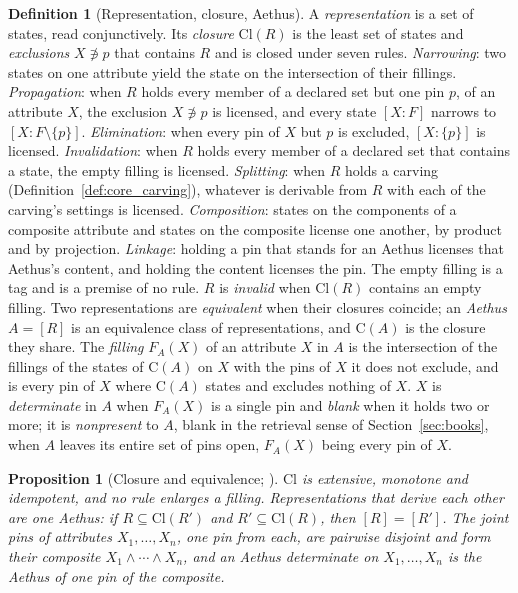 \documentclass[11pt]{article}
\newtheorem{proposition}{Proposition}
\theoremstyle{definition}
\newtheorem{definition}{Definition}
\newcommand{\Aethus}{Aethus}
\begin{document}
\begin{definition}[Representation, closure, \Aethus{}]\label{def:core_aethus}
A \emph{representation} is a set of states, read conjunctively. Its \emph{closure} $\mathrm{Cl}(R)$ is the least set of states and \emph{exclusions} $X \not\ni p$ that contains $R$ and is closed under seven rules. \emph{Narrowing}: two states on one attribute yield the state on the intersection of their fillings. \emph{Propagation}: when $R$ holds every member of a declared set but one pin $p$, of an attribute $X$, the exclusion $X \not\ni p$ is licensed, and every state $[X : F]$ narrows to $[X : F \setminus \{p\}]$. \emph{Elimination}: when every pin of $X$ but $p$ is excluded, $[X : \{p\}]$ is licensed. \emph{Invalidation}: when $R$ holds every member of a declared set that contains a state, the empty filling is licensed. \emph{Splitting}: when $R$ holds a carving (Definition~\ref{def:core_carving}), whatever is derivable from $R$ with each of the carving's settings is licensed. \emph{Composition}: states on the components of a composite attribute and states on the composite license one another, by product and by projection. \emph{Linkage}: holding a pin that stands for an \Aethus{} licenses that \Aethus{}'s content, and holding the content licenses the pin. The empty filling is a tag and is a premise of no rule. $R$ is \emph{invalid} when $\mathrm{Cl}(R)$ contains an empty filling. Two representations are \emph{equivalent} when their closures coincide; an \emph{\Aethus{}} $A = [R]$ is an equivalence class of representations, and $\mathrm{C}(A)$ is the closure they share. The \emph{filling} $F_A(X)$ of an attribute $X$ in $A$ is the intersection of the fillings of the states of $\mathrm{C}(A)$ on $X$ with the pins of $X$ it does not exclude, and is every pin of $X$ where $\mathrm{C}(A)$ states and excludes nothing of $X$. $X$ is \emph{determinate} in $A$ when $F_A(X)$ is a single pin and \emph{blank} when it holds two or more; it is \emph{nonpresent} to $A$, blank in the retrieval sense of Section~\ref{sec:books}, when $A$ leaves its entire set of pins open, $F_A(X)$ being every pin of $X$.
\end{definition}

\begin{proposition}[Closure and equivalence; \cite{Aethus}]\label{prop:core_closure}
$\mathrm{Cl}$ is extensive, monotone and idempotent, and no rule enlarges a filling. Representations that derive each other are one \Aethus{}: if $R \subseteq \mathrm{Cl}(R')$ and $R' \subseteq \mathrm{Cl}(R)$, then $[R] = [R']$. The joint pins of attributes $X_1, \ldots, X_n$, one pin from each, are pairwise disjoint and form their \emph{composite} $X_1 \wedge \cdots \wedge X_n$, and an \Aethus{} determinate on $X_1, \ldots, X_n$ is the \Aethus{} of one pin of the composite.
\end{proposition}
\end{document}
